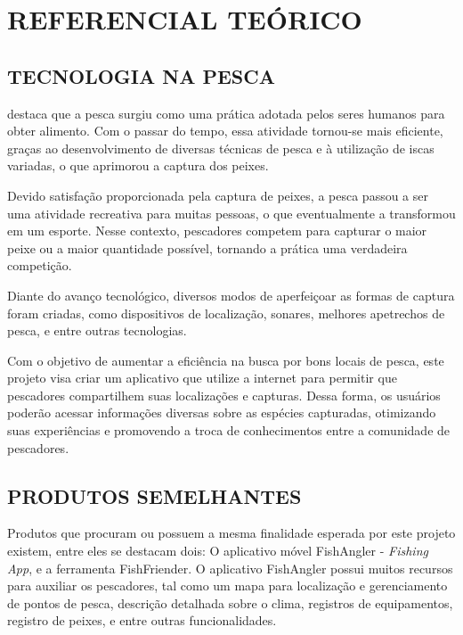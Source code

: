 
\chapter{REFERENCIAL TEÓRICO}
\label{chap:referencialTeorico}

\section{TECNOLOGIA NA PESCA}
\label{sec:referenciasDeDesenvolvimento}

\textcite{de2022roraima} destaca que a pesca surgiu como uma prática adotada pelos seres humanos para obter alimento. Com o passar do tempo, essa atividade tornou-se mais eficiente, graças ao desenvolvimento de diversas técnicas de pesca e à utilização de iscas variadas, o que aprimorou a captura dos peixes.

Devido satisfação proporcionada pela captura de peixes, a pesca passou a ser uma atividade recreativa para muitas pessoas, o que eventualmente a transformou em um esporte. Nesse contexto, pescadores competem para capturar o maior peixe ou a maior quantidade possível, tornando a prática uma verdadeira competição.

Diante do avanço tecnológico, diversos modos de aperfeiçoar as formas de captura foram criadas, como dispositivos de localização, sonares, melhores apetrechos de pesca, e entre outras tecnologias.

Com o objetivo de aumentar a eficiência na busca por bons locais de pesca, este projeto visa criar um aplicativo que utilize a internet para permitir que pescadores compartilhem suas localizações e capturas. Dessa forma, os usuários poderão acessar informações diversas sobre as espécies capturadas, otimizando suas experiências e promovendo a troca de conhecimentos entre a comunidade de pescadores.

\section{PRODUTOS SEMELHANTES}
\label{sec:referenciasDeDesenvolvimento}

Produtos que procuram ou possuem a mesma finalidade esperada por este projeto existem, entre eles se destacam dois: O aplicativo móvel FishAngler - \textit{Fishing App}, e a ferramenta FishFriender. O aplicativo FishAngler possui muitos recursos para auxiliar os pescadores, tal como um mapa para localização e gerenciamento de pontos de pesca, descrição detalhada sobre o clima, registros de equipamentos, registro de peixes, e entre outras funcionalidades.

